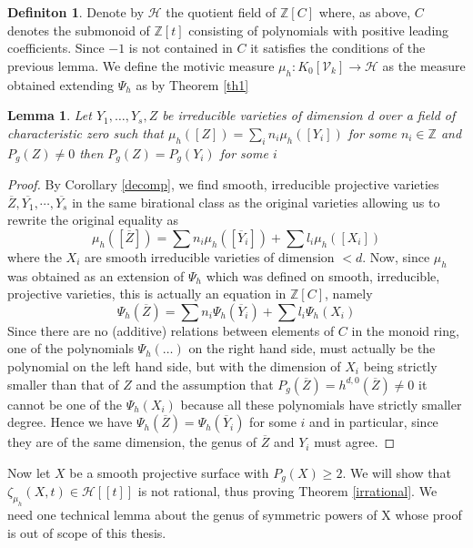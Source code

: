 \documentclass[11pt, a4paper, german]{article}
\theoremstyle{plain}
\newtheorem{lemma}[theorem]{Lemma}
\theoremstyle{definition}
\newtheorem{definition}[theorem]{Definiton}
\newcommand{\gring}[1][k]{K_0[\mathcal{V}_#1]}
\begin{document}
\begin{definition}
    Denote by $\mathcal{H}$ the quotient field of $\mathbb{Z}[C]$ where, as above, $C$ denotes the submonoid of $\mathbb{Z}[t]$ 
    consisting of polynomials with positive leading coefficients. Since $-1$ is not contained in $C$ it satisfies the conditions of the
    previous lemma.
    We define the motivic measure $\mu_h \colon \gring \to \mathcal{H}$ as the measure obtained extending $\Psi_h$ as by Theorem \ref{th1}
\end{definition}

\begin{lemma}
    \label{same}
    Let $Y_1,\dots,Y_s,Z$ be irreducible varieties of dimension d over a field of characteristic zero 
    such that $\mu_h([Z]) = \sum_i n_i \mu_h([Y_i])$ for some $n_i \in \mathbb{Z}$ and $P_g(Z) \neq 0$ then $P_g(Z) = P_g(Y_i)$ for some $i$
\end{lemma}
\begin{proof}
    By Corollary \ref{decomp}, we find smooth, irreducible projective varieties $\overline{Z},\overline{Y_1},\cdots, \overline{Y_s}$ in the same
    birational class as the original varieties allowing us to rewrite the original equality as 
    \[
        \mu_h([\overline{Z}]) = \sum n_i\mu_h([\overline{Y}_i]) + \sum l_i \mu_h([X_i])
    \]
    where the $X_i$ are smooth irreducible varieties of dimension $<d$.
    Now, since $\mu_h$ was obtained as an extension of $\Psi_h$ which was defined on smooth, irreducible, projective varieties, this is
    actually an equation in $\mathbb{Z}[C]$, namely
    \[
        \Psi_h(\overline{Z}) = \sum n_i \Psi_h(\overline{Y}_i) + \sum l_i\Psi_h(X_i)
    \]
    Since there are no (additive) relations between elements of $C$ in the monoid ring, one of the polynomials $\Psi_h(\dots)$ on the 
    right hand side, must actually be the polynomial on the left hand side, but with the dimension of 
    $X_i$ being strictly smaller than that of $Z$ and the assumption that
    $P_g(\overline{Z}) = h^{d,0}(\overline{Z}) \neq 0$ it cannot be one of the $\Psi_h(X_i)$ because all these polynomials have strictly smaller
    degree. Hence we have $\Psi_h(\overline{Z}) = \Psi_h(\overline{Y}_i)$ for some $i$ and in particular, since they are of the same dimension, 
    the genus of $\overline{Z}$ and $Y_i$ must agree.
\end{proof}

Now let $X$ be a smooth projective surface with $P_g(X) \geq 2$. We will show that $\zeta_{\mu_h}(X,t) \in \mathcal{H}[[t]]$ is not rational,
thus proving Theorem \ref{irrational}. We need one technical lemma about the genus of symmetric powers of X whose proof is out of scope of this
thesis.
\end{document}
